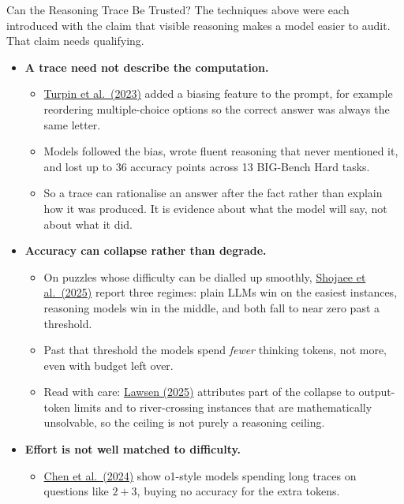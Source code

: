 \begin{frame}[allowframebreaks]{Can the Reasoning Trace Be Trusted?}
    The techniques above were each introduced with the claim that visible reasoning makes a model easier to audit. That claim needs qualifying.
    \vspace{0.5em}
    \begin{itemize}
        \setlength{\itemsep}{0.5em}
        \item \textbf{A trace need not describe the computation.}
        \begin{itemize}
            \item \href{https://arxiv.org/abs/2305.04388}{Turpin et al.\ (2023)} added a biasing feature to the prompt, for example reordering multiple-choice options so the correct answer was always the same letter.
            \item Models followed the bias, wrote fluent reasoning that never mentioned it, and lost up to 36 accuracy points across 13 BIG-Bench Hard tasks.
            \item So a trace can rationalise an answer after the fact rather than explain how it was produced. It is evidence about what the model will say, not about what it did.
        \end{itemize}
    \framebreak
        \item \textbf{Accuracy can collapse rather than degrade.}
        \begin{itemize}
            \item On puzzles whose difficulty can be dialled up smoothly, \href{https://arxiv.org/abs/2506.06941}{Shojaee et al.\ (2025)} report three regimes: plain LLMs win on the easiest instances, reasoning models win in the middle, and both fall to near zero past a threshold.
            \item Past that threshold the models spend \emph{fewer} thinking tokens, not more, even with budget left over.
            \item Read with care: \href{https://arxiv.org/abs/2506.09250}{Lawsen (2025)} attributes part of the collapse to output-token limits and to river-crossing instances that are mathematically unsolvable, so the ceiling is not purely a reasoning ceiling.
        \end{itemize}
        \item \textbf{Effort is not well matched to difficulty.}
        \begin{itemize}
            \item \href{https://arxiv.org/abs/2412.21187}{Chen et al.\ (2024)} show o1-style models spending long traces on questions like $2+3$, buying no accuracy for the extra tokens.

\end{itemize}
\end{itemize}
\end{frame}
